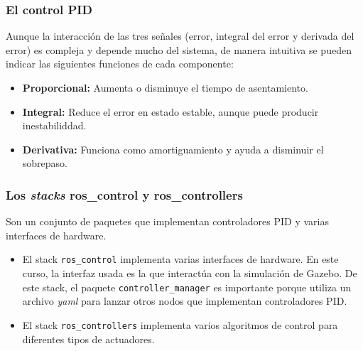 \begin{frame}\frametitle{El control PID}
  Aunque la interacción de las tres señales (error, integral del error y derivada del error) es compleja y depende mucho del sistema, de manera intuitiva se pueden indicar las siguientes funciones de cada componente:
  \begin{itemize}
  \item \textbf{Proporcional:} Aumenta o disminuye el tiempo de asentamiento.
  \item \textbf{Integral:} Reduce el error en estado estable, aunque puede producir inestabiliddad.
  \item \textbf{Derivativa:} Funciona como amortiguamiento y ayuda a disminuir el sobrepaso. 
  \end{itemize}
\end{frame}

\begin{frame}\frametitle{Los \textit{stacks} ros\_control y ros\_controllers}
  Son un conjunto de paquetes que implementan controladores PID y varias interfaces de hardware.
  \begin{itemize}
  \item El stack \texttt{ros\_control} implementa varias interfaces de hardware. En este curso, la interfaz usada es la que interactúa con la simulación de Gazebo. De este stack, el paquete \texttt{controller\_manager} es importante porque utiliza un archivo \textit{yaml} para lanzar otros nodos que implementan controladores PID. 
  \item El stack \texttt{ros\_controllers} implementa varios algoritmos de control para diferentes tipos de actuadores. 
  \end{itemize}
\end{frame}
